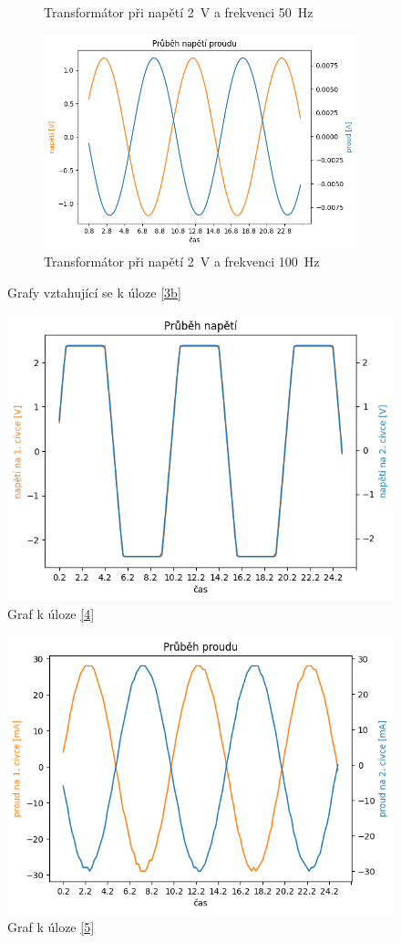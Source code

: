 \documentclass[a4paper]{article}
\begin{document}
\begin{figure}[h!]
\begin{subfigure}{0.49\textwidth}
		\caption{Transformátor při napětí \SI{2}{\volt} a frekvenci \SI{50}{\hertz}}
	\end{subfigure}
	\hfill
	\begin{subfigure}{0.49\textwidth}
		\includegraphics[width=\textwidth]{Trafo3b_2V_100Hz.png}
		\caption{Transformátor při napětí \SI{2}{\volt} a frekvenci \SI{100}{\hertz}}
	\end{subfigure}
	\caption{Grafy vztahující se k úloze \ref{3b}}
\end{figure}

\begin{figure}[h!]
	\centering
	\includegraphics[width=0.6\linewidth]{Trafo4_5V_100Hz.png}
	\caption{Graf k úloze \ref{4}}
\end{figure}

\begin{figure}[h!]
	\centering
	\includegraphics[width=0.6\linewidth]{Trafo5_300mV_100Hz.png}
	\caption{Graf k úloze \ref{5}}
\end{figure}
\end{document}
